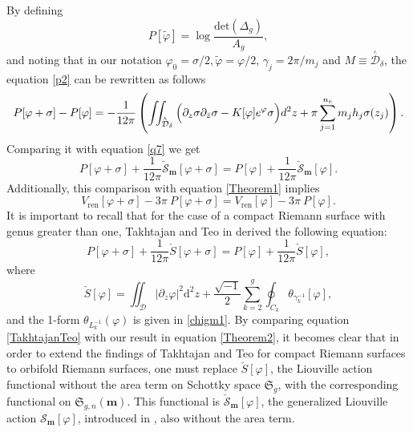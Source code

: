 \documentclass[a4paper,11pt]{article}
\newcommand{\dd}{\mathrm{d}}
\newcommand{\schottky}{\mathfrak{S}}
\newcommand{\SchottkyFund}{\mathcal{D}}
\newcommand{\singfund}{\overset{{}_{\curlywedge}}{\mathcal{D}}}
\begin{document}
By defining 
\begin{equation}
P[\tilde\varphi] =\log \frac{\text{det}(\Delta_{g})}{A_{g}},
\end{equation} 
and noting that in our notation $\varphi_0 = \sigma/2, \tilde{\varphi}=\varphi/2$, $\gamma_{j}= 2\pi/m_j$ and $M\equiv \singfund_{\delta}$, the equation \eqref{p2} can be rewritten as follows
\begin{equation}
P[\varphi+\sigma]-P[\varphi]\\
=-\frac{1}{12\pi}\left(\iint_{\singfund_{\delta}}\Big( \partial_{z}\sigma\partial_{\bar{z}}\sigma   -K[\varphi] e^{\varphi}\sigma\Big) d^{2}z+ \pi\sum_{j=1}^{n_
	e}m_j h_j\sigma(z_j)\right).\label{p3}
\end{equation}
Comparing it with equation \eqref{q7} we get
\begin{equation}
P[\varphi+\sigma]+\frac{1}{12\pi}\check{\mathscr{S}}_{\boldsymbol{m}}[\varphi+\sigma]=P[\varphi]  +\frac{1}{12\pi}\check{\mathscr{S}}_{\boldsymbol{m}}[\varphi]\label{Theorem2}.
\end{equation}
Additionally, this comparison with equation \eqref{Theorem1} implies
\begin{equation}
V_{\text{ren}}[\varphi+\sigma]-3\pi ~P[\varphi+\sigma]=V_{\text{ren}}[\varphi]-3\pi~P[\varphi].\label{Theorem2p}
\end{equation}
It is important to recall that for the case of a compact Riemann surface with genus greater than one, Takhtajan and Teo in \cite{Takhtajan_2003} derived the following equation:
\begin{equation}
P[\varphi+\sigma]+\frac{1}{12\pi}\check S[{\varphi+\sigma}]=P[\varphi]  +\frac{1}{12\pi}\check S[\varphi]\label{TakhtajanTeo},
\end{equation}
where
\begin{equation}
\check S[\varphi] = \iint_{\SchottkyFund} |\partial_z \varphi|^2 \dd^2{z}+ \frac{\sqrt{-1}}{2} \sum_{k=2}^{g} \oint_{C_k} \theta_{\gamma_k^{-1}}[\varphi],
\end{equation}
and the 1-form $\theta_{L_k^{-1}}(\varphi)$ is given in \eqref{chigm1}. By comparing equation \eqref{TakhtajanTeo} with our result in equation \eqref{Theorem2}, it becomes clear that in order to extend the findings of Takhtajan and Teo for compact Riemann surfaces to orbifold Riemann surfaces, one must replace $\check S[\varphi]$, the Liouville action functional without the area term on Schottky space $\schottky_{g}$, with the corresponding functional on $\schottky_{g,n}(\boldsymbol{m})$. This functional is $\check{\mathscr{S}}_{\boldsymbol{m}}[\varphi]$, the generalized Liouville action $\mathscr{S}_{\boldsymbol{m}}[\varphi]$, introduced in \cite{Taghavi2024classical}, also without the area term.
\end{document}
